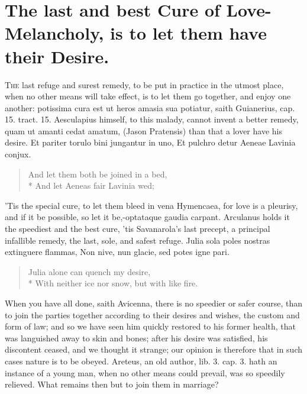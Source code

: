 {%
\section[Let them have their Desire]{The last and best Cure of Love-Melancholy, is to let them have their Desire.}\label{sec:let-them-have-their-desire}

\lettrine{T}{he} last refuge and surest remedy, to be put in practice in the utmost
place, when no other means will take effect, is to let them go
together, and enjoy one another: potissima cura est ut heros amasia sua
potiatur, saith Guianerius, cap. 15. tract. 15. Aesculapius himself, to
this malady, cannot invent a better remedy, quam ut amanti cedat
amatum, (Jason Pratensis) than that a lover have his desire.
Et pariter torulo bini jungantur in uno,
Et pulchro detur Aeneae Lavinia conjux.

\begin{verse}
And let them both be joined in a bed,\\*
And let Aeneas fair Lavinia wed;
\end{verse}

'Tis the special cure, to let them bleed in vena Hymencaea, for love is
a pleurisy, and if it be possible, so let it be,-optataque gaudia
carpant. Arculanus holds it the speediest and the best cure, 'tis
Savanarola's last precept, a principal infallible remedy, the
last, sole, and safest refuge.
Julia sola poles nostras extinguere flammas,
Non nive, nun glacie, sed potes igne pari.

\begin{verse}
Julia alone can quench my desire,\\*
With neither ice nor snow, but with like fire.
\end{verse}

When you have all done, saith Avicenna, there is no speedier or
safer course, than to join the parties together according to their
desires and wishes, the custom and form of law; and so we have seen him
quickly restored to his former health, that was languished away to skin
and bones; after his desire was satisfied, his discontent ceased, and
we thought it strange; our opinion is therefore that in such cases
nature is to be obeyed. Areteus, an old author, lib. 3. cap. 3. hath an
instance of a young man, when no other means could prevail, was
so speedily relieved. What remains then but to join them in marriage?

}
